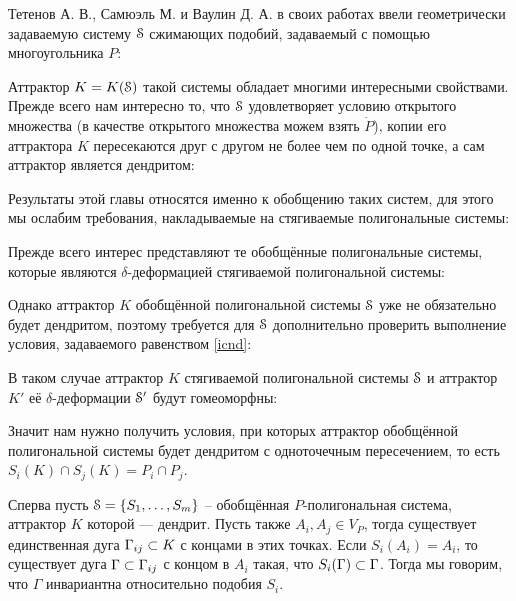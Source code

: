 

Тетенов А. В., Самюэль М. и Ваулин Д. А. в своих работах \cite{TSV2017, STV2017} ввели геометрически задаваемую систему ${\EuScript S}$ сжимающих подобий, задаваемый с помощью многоугольника $P$:


Аттрактор $K=K({\EuScript S})$ такой системы обладает многими интересными свойствами.
Прежде всего нам интересно то, что ${\EuScript S}$ удовлетворяет условию открытого множества (в качестве открытого множества можем взять $\dot P$), копии его аттрактора $K$ пересекаются друг с другом не более чем по одной точке, а сам аттрактор является дендритом:


Результаты этой главы относятся именно к обобщению таких систем, для этого мы ослабим требования, накладываемые на стягиваемые полигональные системы:


Прежде всего интерес представляют те обобщённые полигональные системы, которые являются $\delta$-деформацией стягиваемой полигональной системы:



Однако аттрактор $K$ обобщённой полигональной системы ${\EuScript S}$ уже не обязательно будет дендритом, поэтому требуется для ${\EuScript S}$ дополнительно проверить выполнение условия, задаваемого равенством \eqref{icnd}:


В таком случае аттрактор $K$ стягиваемой полигональной системы ${\EuScript S}$ и аттрактор $K'$ её $\delta$-деформации ${\EuScript S}'$ будут гомеоморфны:


Значит нам нужно получить условия, при которых аттрактор обобщённой полигональной системы будет дендритом с одноточечным пересечением, то есть $S_i(K)\cap S_j(K)=P_i\cap P_j$.


Сперва пусть ${\EuScript S}=\{S_1,\ldots,S_m\}$ -- обобщённая $P$-полигональная система, аттрактор $K$ которой --- дендрит.
Пусть также $A_i,A_j\in V_P$, тогда существует единственная дуга $\Gamma_{ij}\subset K$ с концами в этих точках.
Если $S_i(A_i)=A_i$, то существует дуга $\Gamma\subset\Gamma_{ij}$ с концом в $A_i$ такая, что $S_i(\Gamma)\subset\Gamma$.
Тогда мы говорим, что $\Gamma$ инвариантна относительно подобия $S_i$.

